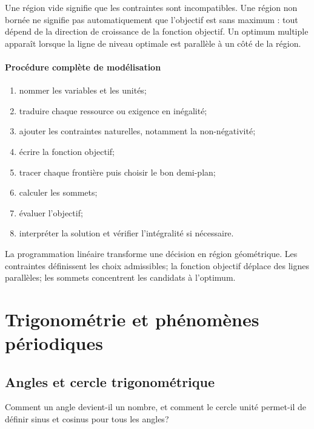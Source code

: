 \documentclass[12pt,a4paper,openany]{book}
\begin{document}
Une région vide signifie que les contraintes sont incompatibles. Une région non bornée ne signifie pas automatiquement que l'objectif est sans maximum : tout dépend de la direction de croissance de la fonction objectif. Un optimum multiple apparaît lorsque la ligne de niveau optimale est parallèle à un côté de la région.

\subsection{Procédure complète de modélisation}

\begin{enumerate}
\item nommer les variables et les unités;
\item traduire chaque ressource ou exigence en inégalité;
\item ajouter les contraintes naturelles, notamment la non-négativité;
\item écrire la fonction objectif;
\item tracer chaque frontière puis choisir le bon demi-plan;
\item calculer les sommets;
\item évaluer l'objectif;
\item interpréter la solution et vérifier l'intégralité si nécessaire.
\end{enumerate}

\begin{summarybox}
La programmation linéaire transforme une décision en région géométrique. Les contraintes définissent les choix admissibles; la fonction objectif déplace des lignes parallèles; les sommets concentrent les candidats à l'optimum.
\end{summarybox}


\part{Trigonométrie et phénomènes périodiques}

\chapter{Angles et cercle trigonométrique}

\begin{questionbox}
Comment un angle devient-il un nombre, et comment le cercle unité permet-il de définir sinus et cosinus pour tous les angles?
\end{questionbox}
\end{document}
